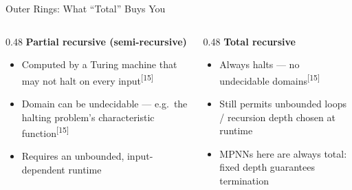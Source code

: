 \documentclass[10pt,aspectratio=169,draft]{beamer}
\newcommand{\pcite}[1]{\textsuperscript{[#1]}}
\begin{document}
\begin{frame}{Outer Rings: What ``Total'' Buys You}
  \begin{columns}[T]
    \begin{column}{0.48\textwidth}
      \textbf{Partial recursive (semi-recursive)}
      \begin{itemize}
        \item Computed by a Turing machine that may not halt on every input\pcite{15}
        \item Domain can be undecidable --- e.g.\ the halting problem's characteristic function\pcite{15}
        \item Requires an unbounded, input-dependent runtime
      \end{itemize}
    \end{column}
    \begin{column}{0.48\textwidth}
      \textbf{Total recursive}
      \begin{itemize}
        \item Always halts --- no undecidable domains\pcite{15}
        \item Still permits unbounded loops / recursion depth chosen at runtime
        \item MPNNs here are always total: fixed depth guarantees termination
      \end{itemize}
    \end{column}
  \end{columns}
  \vspace{0.3cm}
  {\footnotesize{}}
\end{frame}
\end{document}
